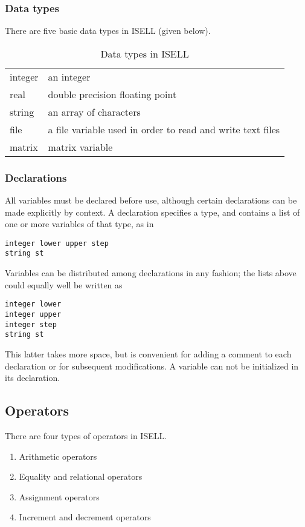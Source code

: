 \documentclass[a4paper,12pt]{book}
\begin{document}
\subsubsection{Data types}
There are five basic data types in ISELL (given below).
\begin{table}[ht]
\begin{center}
\caption{Data types in ISELL}
\begin{tabular}{ll}
\hline
integer    & an integer \\
real  & double precision floating point \\
string & an array of characters \\
file & a file variable used in order to read and write text files\\
matrix & matrix variable \\
\hline
\end{tabular}
\end{center}
\end{table}

\subsubsection{Declarations}
All variables must be declared before use, although certain declarations can be made
explicitly by context. A declaration specifies a type, and contains a list of one or more
variables of that type, as in
\begin{verbatim}
integer lower upper step
string st
\end{verbatim}

Variables can be distributed among declarations in any fashion; the lists above could equally
well be written as
\begin{verbatim}
integer lower
integer upper
integer step
string st
\end{verbatim}

This latter takes more space, but is convenient for adding a comment to each declaration or for subsequent
modifications. A variable can not be initialized in its declaration. 

\subsection{Operators}
There are four types of operators in ISELL.
\begin{enumerate}
\item Arithmetic operators
\item Equality and relational operators
\item Assignment operators
\item Increment and decrement operators
\end{enumerate}
\end{document}
